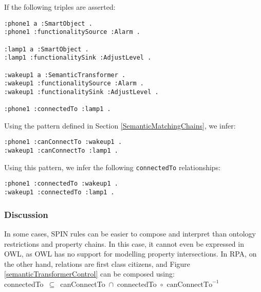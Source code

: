 If the following triples are asserted:

\begin{verbatim}
:phone1 a :SmartObject .
:phone1 :functionalitySource :Alarm .

:lamp1 a :SmartObject .
:lamp1 :functionalitySink :AdjustLevel .

:wakeup1 a :SemanticTransformer .
:wakeup1 :functionalitySource :Alarm .
:wakeup1 :functionalitySink :AdjustLevel .

:phone1 :connectedTo :lamp1 .
\end{verbatim}

Using the pattern defined in Section \ref{SemanticMatchingChains}, we infer:

\begin{verbatim}
:phone1 :canConnectTo :wakeup1 .
:wakeup1 :canConnectTo :lamp1 .
\end{verbatim}

Using this pattern, we infer the following \texttt{connectedTo} relationships:

\begin{verbatim}
:phone1 :connectedTo :wakeup1 .
:wakeup1 :connectedTo :lamp1 .
\end{verbatim}

\subsubsection{Discussion}

% 
In some cases, \ac{SPIN} rules can be easier to compose and interpret than ontology restrictions and property chains. In this case, it cannot even be expressed in \ac{OWL}, as \ac{OWL} has no support for modelling property intersections. In \ac{RPA}, on the other hand, relations are first class citizens, and Figure \ref{semanticTransformerControl} can be composed using:\\

\noindent
connectedTo~\ensuremath{\subseteq}~canConnectTo~\ensuremath{\cap}~connectedTo~\ensuremath{\circ}~$\text{canConnectTo}^{-1}$\\


